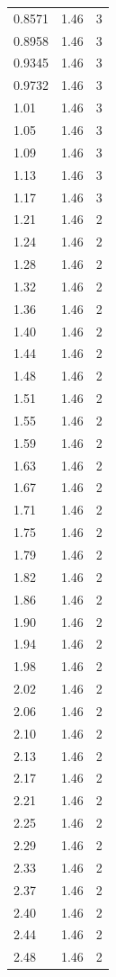 \begin{longtable}{lrr}
  0.8571 & 1.46 & 3 \\
  0.8958 & 1.46 & 3 \\
  0.9345 & 1.46 & 3 \\
  0.9732 & 1.46 & 3 \\
  1.01 & 1.46 & 3 \\
  1.05 & 1.46 & 3 \\
  1.09 & 1.46 & 3 \\
  1.13 & 1.46 & 3 \\
  1.17 & 1.46 & 3 \\
  1.21 & 1.46 & 2 \\
  1.24 & 1.46 & 2 \\
  1.28 & 1.46 & 2 \\
  1.32 & 1.46 & 2 \\
  1.36 & 1.46 & 2 \\
  1.40 & 1.46 & 2 \\
  1.44 & 1.46 & 2 \\
  1.48 & 1.46 & 2 \\
  1.51 & 1.46 & 2 \\
  1.55 & 1.46 & 2 \\
  1.59 & 1.46 & 2 \\
  1.63 & 1.46 & 2 \\
  1.67 & 1.46 & 2 \\
  1.71 & 1.46 & 2 \\
  1.75 & 1.46 & 2 \\
  1.79 & 1.46 & 2 \\
  1.82 & 1.46 & 2 \\
  1.86 & 1.46 & 2 \\
  1.90 & 1.46 & 2 \\
  1.94 & 1.46 & 2 \\
  1.98 & 1.46 & 2 \\
  2.02 & 1.46 & 2 \\
  2.06 & 1.46 & 2 \\
  2.10 & 1.46 & 2 \\
  2.13 & 1.46 & 2 \\
  2.17 & 1.46 & 2 \\
  2.21 & 1.46 & 2 \\
  2.25 & 1.46 & 2 \\
  2.29 & 1.46 & 2 \\
  2.33 & 1.46 & 2 \\
  2.37 & 1.46 & 2 \\
  2.40 & 1.46 & 2 \\
  2.44 & 1.46 & 2 \\
  2.48 & 1.46 & 2 \\

\end{longtable}
